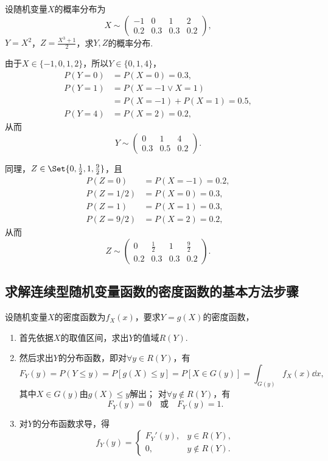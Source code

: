 \begin{example}
设随机变量\(X\)的概率分布为\[
X \sim \begin{pmatrix}
-1 & 0 & 1 & 2 \\
0.2 & 0.3 & 0.3 & 0.2
\end{pmatrix},
\]\(Y=X^2\)，\(Z=\frac{X^3+1}{2}\)，求\(Y,Z\)的概率分布.
\begin{solution}
由于\(X\in\{-1,0,1,2\}\)，所以\(Y\in\{0,1,4\}\)，\begin{align*}
P(Y=0) &= P(X=0) = 0.3, \\
P(Y=1) &= P(X=-1 \lor X=1) \\
	&= P(X=-1) + P(X=1)
	= 0.5, \\
P(Y=4) &= P(X=2) = 0.2,
\end{align*}
从而\[
Y \sim \begin{pmatrix}
0 & 1 & 4 \\
0.3 & 0.5 & 0.2
\end{pmatrix}.
\]

同理，\(Z\in\Set{0,\frac{1}{2},1,\frac{9}{2}}\)，且\begin{align*}
P(Z=0) &= P(X=-1) = 0.2, \\
P(Z=1/2) &= P(X=0) = 0.3, \\
P(Z=1) &= P(X=1) = 0.3, \\
P(Z=9/2) &= P(X=2) = 0.2,
\end{align*}
从而\[
Z \sim \begin{pmatrix}
0 & \frac{1}{2} & 1 & \frac{9}{2} \\
0.2 & 0.3 & 0.3 & 0.2
\end{pmatrix}.
\]
\end{solution}
\end{example}

\subsection{求解连续型随机变量函数的密度函数的基本方法步骤}
设随机变量\(X\)的密度函数为\(f_X(x)\)，要求\(Y = g(X)\)的密度函数，\begin{enumerate}
\item 首先依据\(X\)的取值区间，求出\(Y\)的值域\(R(Y)\).

\item 然后求出\(Y\)的分布函数，即对\(\forall y \in R(Y)\)，有\[
F_Y(y) = P(Y \leq y)
= P[g(X) \leq y]
= P[X \in G(y)]
= \int_{G(y)} f_X(x) \dd{x},
\]
其中\(X \in G(y)\)由\(g(X) \leq y\)解出；
对\(\forall y \notin R(Y)\)，有\[
F_Y(y) = 0
\quad\text{或}\quad
F_Y(y) = 1.
\]

\item 对\(Y\)的分布函数求导，得\[
f_Y(y) = \left\{ \begin{array}{cl}
F_Y'(y), & y \in R(Y), \\
0, & y \notin R(Y).
\end{array} \right.
\]
\end{enumerate}
